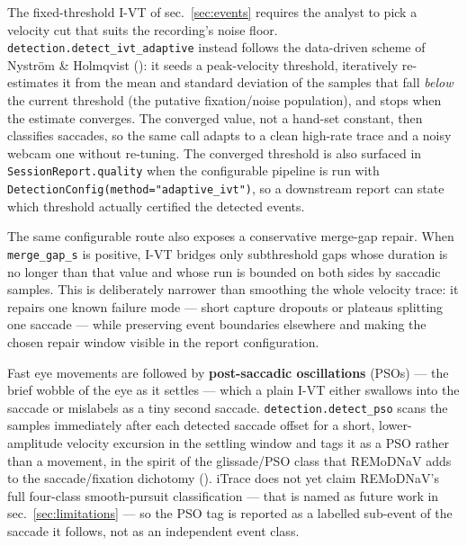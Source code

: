 \documentclass[
]{article}
\begin{document}
The fixed-threshold I-VT of sec.~\ref{sec:events} requires the analyst
to pick a velocity cut that suits the recording's noise floor.
\texttt{detection.detect\_ivt\_adaptive} instead follows the data-driven
scheme of Nyström \& Holmqvist
(): it
seeds a peak-velocity threshold, iteratively re-estimates it from the
mean and standard deviation of the samples that fall \emph{below} the
current threshold (the putative fixation/noise population), and stops
when the estimate converges. The converged value, not a hand-set
constant, then classifies saccades, so the same call adapts to a clean
high-rate trace and a noisy webcam one without re-tuning. The converged
threshold is also surfaced in \texttt{SessionReport.quality} when the
configurable pipeline is run with
\texttt{DetectionConfig(method="adaptive\_ivt")}, so a downstream report
can state which threshold actually certified the detected events.

The same configurable route also exposes a conservative merge-gap
repair. When \texttt{merge\_gap\_s} is positive, I-VT bridges only
subthreshold gaps whose duration is no longer than that value and whose
run is bounded on both sides by saccadic samples. This is deliberately
narrower than smoothing the whole velocity trace: it repairs one known
failure mode --- short capture dropouts or plateaus splitting one
saccade --- while preserving event boundaries elsewhere and making the
chosen repair window visible in the report configuration.

Fast eye movements are followed by \textbf{post-saccadic oscillations}
(PSOs) --- the brief wobble of the eye as it settles --- which a plain
I-VT either swallows into the saccade or mislabels as a tiny second
saccade. \texttt{detection.detect\_pso} scans the samples immediately
after each detected saccade offset for a short, lower-amplitude velocity
excursion in the settling window and tags it as a PSO rather than a
movement, in the spirit of the glissade/PSO class that REMoDNaV adds to
the saccade/fixation dichotomy (). iTrace does not yet claim REMoDNaV's full
four-class smooth-pursuit classification --- that is named as future
work in sec.~\ref{sec:limitations} --- so the PSO tag is reported as a
labelled sub-event of the saccade it follows, not as an independent
event class.
\end{document}
